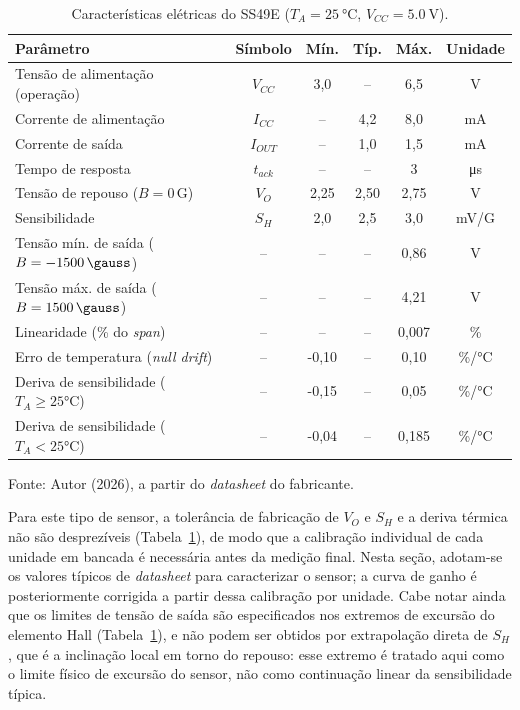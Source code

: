 \documentclass[12pt,a4paper]{article}
\begin{document}
\begin{table}[H]
\centering
\caption{Características elétricas do SS49E ($T_A = \SI{25}{\celsius}$, $V_{CC} = \SI{5,0}{\volt}$).}
\label{tab:datasheet_ss49e}
\begin{tabular}{lccccc}
\toprule
\textbf{Parâmetro} & \textbf{Símbolo} & \textbf{Mín.} & \textbf{Típ.} & \textbf{Máx.} & \textbf{Unidade} \\
\midrule
Tensão de alimentação (operação) & $V_{CC}$ & 3,0 & -- & 6,5 & V \\
Corrente de alimentação & $I_{CC}$ & -- & 4,2 & 8,0 & mA \\
Corrente de saída & $I_{OUT}$ & -- & 1,0 & 1,5 & mA \\
Tempo de resposta & $t_{ack}$ & -- & -- & 3 & \si{\micro\second} \\
Tensão de repouso ($B=0\,\text{G}$) & $V_O$ & 2,25 & 2,50 & 2,75 & V \\
Sensibilidade & $S_H$ & 2,0 & 2,5 & 3,0 & mV/G \\
Tensão mín. de saída ($B=\SI{-1500}{\gauss}$) & -- & -- & -- & 0,86 & V \\
Tensão máx. de saída ($B=\SI{+1500}{\gauss}$) & -- & -- & -- & 4,21 & V \\
Linearidade (\% do \textit{span}) & -- & -- & -- & 0,007 & \% \\
Erro de temperatura (\textit{null drift}) & -- & -0,10 & -- & 0,10 & \%/\si{\celsius} \\
Deriva de sensibilidade ($T_A \geq 25\si{\celsius}$) & -- & -0,15 & -- & 0,05 & \%/\si{\celsius} \\
Deriva de sensibilidade ($T_A < 25\si{\celsius}$) & -- & -0,04 & -- & 0,185 & \%/\si{\celsius} \\
\bottomrule
\end{tabular}

\vspace{2pt}
{\small Fonte: Autor (2026), a partir do \textit{datasheet} do fabricante.}
\end{table}

Para este tipo de sensor, a tolerância de fabricação de $V_O$ e $S_H$ e a
deriva térmica não são desprezíveis (Tabela~\ref{tab:datasheet_ss49e}), de
modo que a calibração individual de cada unidade em bancada é necessária
antes da medição final. Nesta seção, adotam-se os valores típicos de
\textit{datasheet} para caracterizar o sensor; a curva de ganho é
posteriormente corrigida a partir dessa calibração por unidade. Cabe notar
ainda que os limites de tensão de saída são especificados nos extremos de
excursão do elemento Hall (Tabela~\ref{tab:datasheet_ss49e}), e não podem
ser obtidos por extrapolação direta de $S_H$, que é a inclinação local em
torno do repouso: esse extremo é tratado aqui como o limite físico de
excursão do sensor, não como continuação linear da sensibilidade típica.
\end{document}
